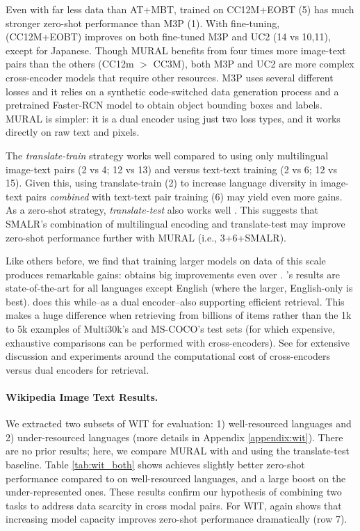         
        Even with far less data than AT+MBT, \muralbase trained on CC12M+EOBT (5) has much stronger zero-shot performance than M3P (1). With fine-tuning, \muralbase (CC12M+EOBT) improves on both fine-tuned M3P and UC2 (14 vs 10,11), except for Japanese. Though MURAL benefits from four times more image-text pairs than the others (CC12m $>$ CC3M), both M3P and UC2 are more complex cross-encoder models that require other resources. M3P uses several different losses and it relies on a synthetic code-switched data generation process and a pretrained Faster-RCN model to obtain object bounding boxes and labels. MURAL is simpler: it is a dual encoder using just two loss types, and it works directly on raw text and pixels.
        
        
        
        The \textit{translate-train} strategy works well compared to using only multilingual image-text pairs (2 vs 4; 12 vs 13) and versus text-text training (2 vs 6; 12 vs 15). Given this, using translate-train (2) to increase language diversity in image-text pairs \textit{combined} with text-text pair training (6) may yield even more gains. As a zero-shot strategy, \textit{translate-test} also works well . This suggests that SMALR's combination of multilingual encoding and translate-test \cite{burns2020eccv} may improve zero-shot performance further with MURAL (i.e., 3+6+SMALR).
        
        Like others before, we find that training larger models on data of this scale produces remarkable gains: \murallarge obtains big improvements even over \muralbase. \murallarge's results are state-of-the-art for all languages except English (where the larger, English-only \alignhuge is best). \murallarge does this while--as a dual encoder--also supporting efficient retrieval. This makes a huge difference when retrieving from billions of items rather than the 1k to 5k examples of Multi30k's and MS-COCO's test sets (for which expensive, exhaustive comparisons can be performed with cross-encoders). See \citet{geigle-etal-retrieval} for extensive discussion and experiments around the computational cost of cross-encoders versus dual encoders for retrieval.
        






        \paragraph{Wikipedia Image Text Results.} We extracted two subsets of WIT for evaluation: 1) well-resourced languages and 2) under-resourced languages (more details in Appendix \ref{appendix:wit}). There are no prior results; here, we compare MURAL with \alignmling and \alignen using the translate-test baseline. Table \ref{tab:wit_both} shows \muralbase achieves slightly better zero-shot performance compared to \alignmling on well-resourced languages, and a large boost on the under-represented ones. These results confirm our hypothesis of combining two tasks to address data scarcity in cross modal pairs. For WIT, \murallarge again shows that increasing model capacity improves zero-shot performance dramatically (row 7).
        

